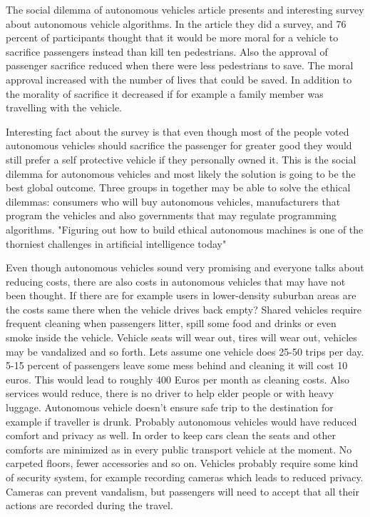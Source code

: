 \documentclass[english]{tktltiki}
\begin{document}
The social dilemma of autonomous vehicles article presents and interesting 
survey about autonomous vehicle algorithms. In the article they did a survey, 
and 76 percent of participants thought that it would be more moral for a vehicle 
to sacrifice passengers instead than kill ten pedestrians. \cite{dilemma} Also 
the approval of passenger sacrifice reduced when there were less pedestrians to 
save. The moral approval increased with the number of lives that could be saved. 
In addition to the morality of sacrifice it decreased if for example a family 
member was travelling with the vehicle.

Interesting fact about the survey is that even though most of the people voted 
autonomous vehicles should sacrifice the passenger for greater good they would 
still prefer a self protective vehicle if they personally owned it. 
\cite{dilemma} This is the social dilemma for autonomous vehicles and most 
likely the solution is going to be the best global outcome. Three groups in 
together may be able to solve the ethical dilemmas: \cite{differences} consumers who will buy 
autonomous vehicles, manufacturers that program the vehicles and also 
governments that may regulate programming algorithms. "Figuring out how to build 
ethical autonomous machines is one of the thorniest challenges in artificial 
intelligence today"

Even though autonomous vehicles sound very promising and everyone talks about 
reducing costs, there are also costs in autonomous vehicles that may have not 
been thought. If there are for example users in lower-density suburban areas are 
the costs same there when the vehicle drives back empty? Shared vehicles require 
frequent cleaning when passengers litter, spill some food and drinks or even 
smoke inside the vehicle. Vehicle seats will wear out, tires will wear out, 
vehicles may be vandalized and so forth. Lets assume one vehicle does 25-50 
trips per day. 5-15 percent of passengers leave some mess behind and cleaning it 
will cost 10 euros. This would lead to roughly 400 Euros per month as cleaning 
costs. Also services would reduce, there is no driver to help elder people or 
with heavy luggage. Autonomous vehicle doesn't ensure safe trip to the 
destination for example if traveller is drunk. Probably autonomous vehicles 
would have reduced comfort and privacy as well. In order to keep cars clean the 
seats and other comforts are minimized as in every public transport vehicle at 
the moment. No carpeted floors, fewer accessories and so on. Vehicles probably 
require some kind of security system, for example recording cameras which leads 
to reduced privacy. Cameras can prevent vandalism, but passengers will need to 
accept that all their actions are recorded during the travel. 
\end{document}
